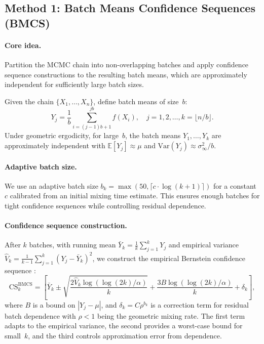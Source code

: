 \documentclass[11pt]{article}
\newcommand{\E}{\mathbb{E}}
\newcommand{\Var}{\mathrm{Var}}
\newcommand{\CS}{\mathrm{CS}}
\begin{document}
\subsection{Method 1: Batch Means Confidence Sequences (BMCS)}

\paragraph{Core idea.} Partition the MCMC chain into non-overlapping batches and apply confidence sequence constructions to the resulting batch means, which are approximately independent for sufficiently large batch sizes.

Given the chain $\{X_1, \ldots, X_n\}$, define batch means of size~$b$:
\begin{equation}
Y_j = \frac{1}{b}\sum_{i=(j-1)b+1}^{jb} f(X_i), \quad j = 1, 2, \ldots, k = \lfloor n/b \rfloor.
\label{eq:batch_means}
\end{equation}
Under geometric ergodicity, for large~$b$, the batch means $Y_1, \ldots, Y_k$ are approximately independent with $\E[Y_j] \approx \mu$ and $\Var(Y_j) \approx \sigma^2_\infty / b$.

\paragraph{Adaptive batch size.} We use an adaptive batch size $b_k = \max(50, \lceil c \cdot \log(k+1) \rceil)$ for a constant~$c$ calibrated from an initial mixing time estimate. This ensures enough batches for tight confidence sequences while controlling residual dependence.

\paragraph{Confidence sequence construction.} After $k$ batches, with running mean $\bar{Y}_k = \frac{1}{k}\sum_{j=1}^k Y_j$ and empirical variance $\hat{V}_k = \frac{1}{k-1}\sum_{j=1}^k (Y_j - \bar{Y}_k)^2$, we construct the empirical Bernstein confidence sequence \citep{howard2021time}:
\begin{equation}
\CS_k^{\text{BMCS}} = \left[\bar{Y}_k \pm \sqrt{\frac{2\hat{V}_k \log(\log(2k)/\alpha)}{k}} + \frac{3B\log(\log(2k)/\alpha)}{k} + \delta_k\right],
\label{eq:bmcs}
\end{equation}
where $B$ is a bound on $|Y_j - \mu|$, and $\delta_k = C\rho^{b_k}$ is a correction term for residual batch dependence with $\rho < 1$ being the geometric mixing rate. The first term adapts to the empirical variance, the second provides a worst-case bound for small~$k$, and the third controls approximation error from dependence.
\end{document}
